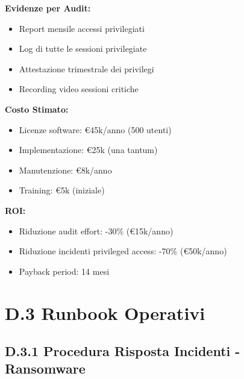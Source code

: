 \begin{tcolorbox}
\textbf{Evidenze per Audit:}
\begin{itemize}
    \item Report mensile accessi privilegiati
    \item Log di tutte le sessioni privilegiate
    \item Attestazione trimestrale dei privilegi
    \item Recording video sessioni critiche
\end{itemize}

\textbf{Costo Stimato:}
\begin{itemize}
    \item Licenze software: €45k/anno (500 utenti)
    \item Implementazione: €25k (una tantum)
    \item Manutenzione: €8k/anno
    \item Training: €5k (iniziale)
\end{itemize}

\textbf{ROI:}
\begin{itemize}
    \item Riduzione audit effort: -30\% (€15k/anno)
    \item Riduzione incidenti privileged access: -70\% (€50k/anno)
    \item Payback period: 14 mesi
\end{itemize}
\end{tcolorbox}

\section{D.3 Runbook Operativi}

\subsection{D.3.1 Procedura Risposta Incidenti - Ransomware}

